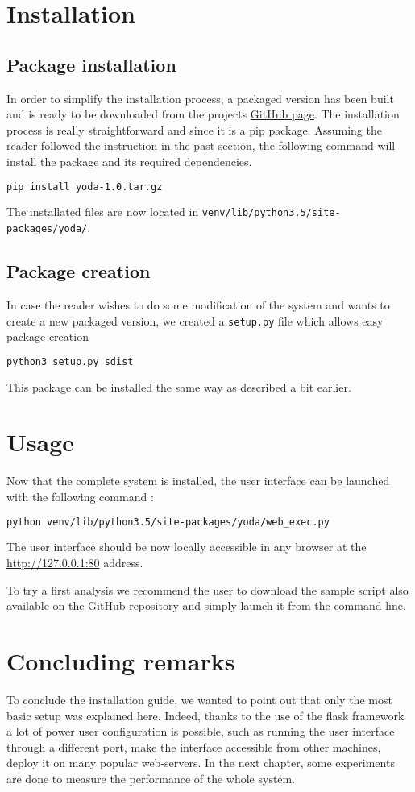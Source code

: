 \section{Installation}
\subsection{Package installation}
In order to simplify the installation process, a packaged version has been built and is ready to be downloaded from the projects \href{https://github.com/dchenaux/Yoda}{GitHub page}. The installation process is really straightforward and since it is a \gls{pip} package. Assuming the reader followed the instruction in the past section, the following command will install the package and its required dependencies. 
\smallskip
\begin{lstlisting}[language=bash]
pip install yoda-1.0.tar.gz
\end{lstlisting}

The installated files are now located in \texttt{venv/lib/python3.5/site-packages/yoda/}.

\subsection{Package creation}
In case the reader wishes to do some modification of the system and wants to create a new packaged version, we created a \texttt{setup.py} file which allows easy package creation
\smallskip
\begin{lstlisting}[language=bash]
python3 setup.py sdist
\end{lstlisting}

This package can be installed the same way as described a bit earlier.

\section{Usage}
Now that the complete system is installed, the user interface can be launched with the following command :
\smallskip
\begin{lstlisting}[language=bash]
python venv/lib/python3.5/site-packages/yoda/web_exec.py
\end{lstlisting}
The user interface should be now locally accessible in any browser at the \url{http://127.0.0.1:80} address.

To try a first analysis we recommend the user to download the sample script also available on the GitHub repository and simply launch it from the command line.

\section{Concluding remarks}
To conclude the installation guide, we wanted to point out that only the most basic setup was explained here. Indeed, thanks to the use of the flask framework a lot of power user configuration is possible, such as running the user interface through a different port, make the interface accessible from other machines, deploy it on many popular web-servers. In the next chapter, some experiments are done to measure the performance of the whole system.
